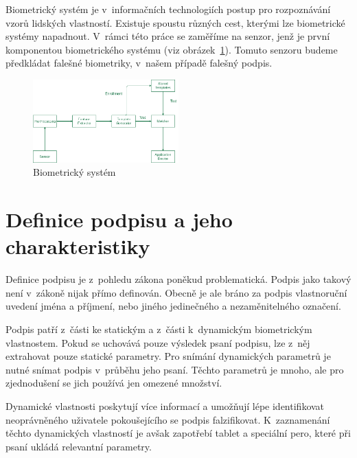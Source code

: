 Biometrický systém je v~informačních technologiích postup pro rozpoznávání vzorů lidských vlastností.       %
Existuje spoustu různých cest, kterými lze biometrické systémy napadnout.                                   %
V~rámci této práce se zaměříme na senzor, jenž je první komponentou biometrického systému (viz obrázek~\ref{fig:biometricky_system}). %
Tomuto senzoru budeme předkládat falešné biometriky, v~našem případě falešný podpis.~\cite{DrahanskýMartin2011}%

\begin{figure}[h]
  \centering
  \includegraphics[width=0.5\textwidth]{obrazky-figures/biometricky_system.png}
  \caption{Biometrický systém~\cite{geeksforGeeks2022}}  %
  \label{fig:biometricky_system}
\end{figure}

\section{Definice podpisu a jeho charakteristiky}
Definice podpisu je z~pohledu zákona poněkud problematická. 
Podpis jako takový není v~zákoně nijak přímo definován. 
Obecně je ale bráno za podpis vlastnoruční uvedení jména a příjmení, nebo jiného jedinečného a nezaměnitelného označení.~\cite{Fulsoft2023} %

Podpis patří z~části ke statickým a z~části k~dynamickým biometrickým vlastnostem.
Pokud se uchovává pouze výsledek psaní podpisu, lze z~něj extrahovat pouze statické parametry.
Pro snímání dynamických parametrů je nutné snímat podpis v~průběhu jeho psaní.
Těchto parametrů je mnoho, ale pro zjednodušení se jich používá jen omezené množství.

Dynamické vlastnosti poskytují více informací a umožňují lépe identifikovat neoprávněného uživatele pokoušejícího se podpis falzifikovat.    %
K~zaznamenání těchto dynamických vlastností je avšak zapotřebí tablet a speciální pero, které při psaní ukládá relevantní parametry.~\cite{DrahanskýMartin2011}  %
\newline

